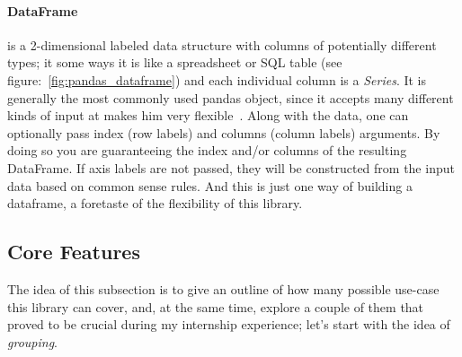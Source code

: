 \paragraph{DataFrame} is a 2-dimensional labeled data structure with columns of potentially different types; it some ways it is like a spreadsheet or SQL table (see figure:~\ref{fig:pandas_dataframe}) and each individual column is a \textit{Series}.
It is generally the most commonly used pandas object, since it accepts many different kinds of input at makes him very flexible~\cite{reback_pandas-dev/pandas:_2022}.
Along with the data, one can optionally pass index (row labels) and columns (column labels) arguments. By doing so you are guaranteeing the index and/or columns of the resulting DataFrame.
If axis labels are not passed, they will be constructed from the input data based on common sense rules.
And this is just one way of building a dataframe, a foretaste of the flexibility of this library.

\subsection{Core Features}
The idea of this subsection is to give an outline of how many possible use-case this library can cover, and, at the same time, explore a couple of them that proved to be crucial during my internship experience; let's start with the idea of \textit{grouping}.

